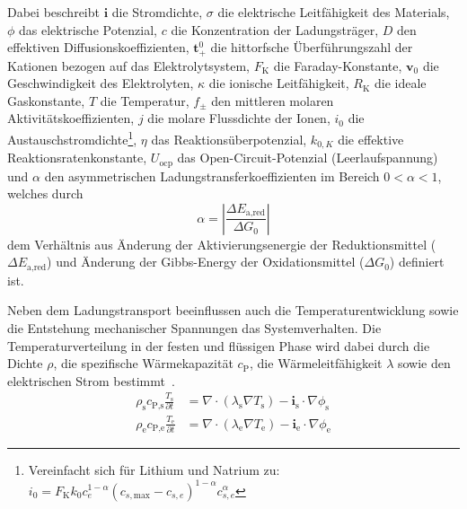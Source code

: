 Dabei beschreibt $\boldsymbol{i}$ die Stromdichte, $\sigma$ die elektrische Leitfähigkeit des Materials, $\phi$ das elektrische Potenzial, $c$ die Konzentration der Ladungsträger, $D$ den effektiven Diffusionskoeffizienten, $\boldsymbol{t}^0_+$ die hittorfsche Überführungszahl der Kationen bezogen auf das Elektrolytsystem, $F_{\text{K}}$ die Faraday-Konstante, $\boldsymbol{v}_0$ die Geschwindigkeit des Elektrolyten, $\kappa$ die ionische Leitfähigkeit, $R_{\text{K}}$ die ideale Gaskonstante, $T$ die Temperatur, $f_{\pm}$ den mittleren molaren Aktivitätskoeffizienten, $j$ die molare Flussdichte der Ionen, $i_0$ die Austauschstromdichte\footnote{Vereinfacht sich für Lithium und Natrium zu: $i_0 = F_{\text{K}} k_0 c_e^{1-\alpha} (c_{s,\text{max}} - c_{s,e})^{1-\alpha} c_{s,e}^\alpha$}, $\eta$ das Reaktionsüberpotenzial, $k_{0,K}$ die effektive Reaktionsratenkonstante, $U_{\text{ocp}}$ das Open-Circuit-Potenzial (Leerlaufspannung) und $\alpha$ den asymmetrischen Ladungstransferkoeffizienten im Bereich $0 < \alpha < 1$, welches durch
\begin{equation}
        \alpha = \left|\frac{\Delta E_{\text{a,red}}}{\Delta G_0}\right|
\end{equation}
dem Verhältnis aus Änderung der Aktivierungsenergie der Reduktionsmittel ($\Delta E_{\text{a,red}}$) und Änderung der Gibbs-Energy der Oxidationsmittel ($\Delta G_0$) definiert ist.

Neben dem Ladungstransport beeinflussen auch die Temperaturentwicklung sowie die Entstehung mechanischer Spannungen das Systemverhalten.  
Die Temperaturverteilung in der festen und flüssigen Phase wird dabei durch die Dichte $\rho$, die spezifische Wärmekapazität $c_\text{P}$, die Wärmeleitfähigkeit $\lambda$ sowie den elektrischen Strom bestimmt~\cite{Gao2021,Katrasnik2021}.
\begin{align}
    \rho_{\text{s}} c_{\text{P,s}} \frac{T_{\text{s}}}{\partial t} &= \nabla \cdot (\lambda_{\text{s}} \nabla T_{\text{s}}) - \boldsymbol{i}_{\text{s}} \cdot \nabla \phi_{\text{s}}\\
    \rho_{\text{e}} c_{\text{P,e}} \frac{T_{\text{e}}}{\partial t} &= \nabla \cdot (\lambda_{\text{e}} \nabla T_{\text{e}}) - \boldsymbol{i}_{\text{e}} \cdot \nabla \phi_{\text{e}}
\end{align}

